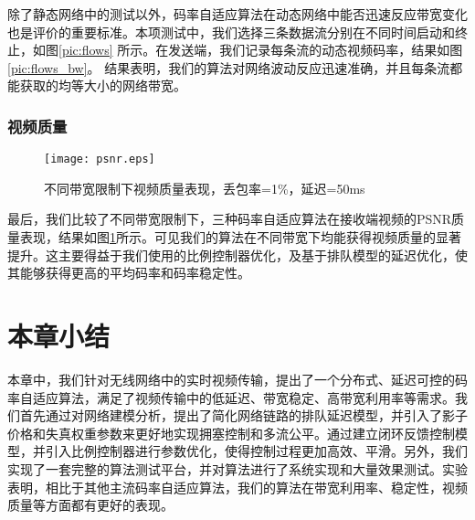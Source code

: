         除了静态网络中的测试以外，码率自适应算法在动态网络中能否迅速反应带宽变化也是评价的重要标准。本项测试中，我们选择三条数据流分别在不同时间启动和终止，如图\ref{pic:flows} 所示。在发送端，我们记录每条流的动态视频码率，结果如图\ref{pic:flows_bw}。 结果表明，我们的算法对网络波动反应迅速准确，并且每条流都能获取的均等大小的网络带宽。

        \subsubsection{视频质量}
        \begin{figure}[htbp]
          \centering
          \texttt{[image: psnr.eps]}
          \caption{不同带宽限制下视频质量表现，丢包率=1\%，延迟=50ms}
          \label{pic:psnr}
        \end{figure}

        最后，我们比较了不同带宽限制下，三种码率自适应算法在接收端视频的PSNR质量表现，结果如图\ref{pic:psnr}所示。可见我们的算法在不同带宽下均能获得视频质量的显著提升。这主要得益于我们使用的比例控制器优化，及基于排队模型的延迟优化，使其能够获得更高的平均码率和码率稳定性。


\section{本章小结}
本章中，我们针对无线网络中的实时视频传输，提出了一个分布式、延迟可控的码率自适应算法，满足了视频传输中的低延迟、带宽稳定、高带宽利用率等需求。我们首先通过对网络建模分析，提出了简化网络链路的排队延迟模型，并引入了影子价格和失真权重参数来更好地实现拥塞控制和多流公平。通过建立闭环反馈控制模型，并引入比例控制器进行参数优化，使得控制过程更加高效、平滑。另外，我们实现了一套完整的算法测试平台，并对算法进行了系统实现和大量效果测试。实验表明，相比于其他主流码率自适应算法，我们的算法在带宽利用率、稳定性，视频质量等方面都有更好的表现。
